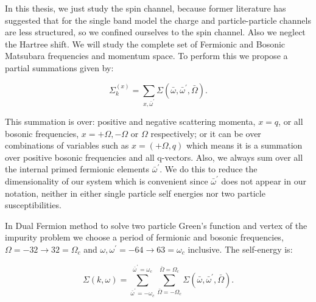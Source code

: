 In this thesis, we just study the spin channel, because former literature has suggested that for the single band model the charge and particle-particle channels are less structured, so we confined ourselves to the spin channel. Also we neglect the Hartree shift. We will study the complete set of Fermionic and Bosonic Matsubara frequencies and momentum space. To perform this we propose a partial summations given by:

\begin{equation}
    \Sigma_k^{(x)}= \sum\limits_{x, \bar{\omega}^\prime} \Sigma(\bar{\omega},\bar{\omega}^\prime, \bar{\Omega}).
\end{equation}

This summation is over: positive and negative scattering momenta, $x=q$, or all bosonic frequencies, $x= +\Omega, -\Omega$  or $\Omega$ respectively; or it can be over combinations of variables such as $x=(+\Omega, q)$ which means it is a summation over positive bosonic frequencies and all q-vectors. Also, we always sum over all the internal primed fermionic elements $\bar{\omega}^\prime$. We do this to reduce the dimensionality of our system which is convenient since $\bar{\omega}^\prime$ does not appear in our notation, neither in either single particle self energies nor two particle susceptibilities.

In Dual Fermion method to solve two particle Green's function and vertex of the impurity problem we choose a period of fermionic and bosonic frequencies, $\Omega= -32 \to 32= \Omega_c$ and $\omega,\omega^\prime = -64 \to 63=\omega_c$ inclusive. The self-energy is:

    \begin{equation}
     \Sigma(k,\omega)= \sum\limits_{ \bar{\omega}^\prime =-\omega _c}^{ \bar{\omega}^\prime =\omega _c}\sum\limits_{ \bar{\Omega} =-\Omega _c}^{\bar{\Omega} =\Omega _c} \Sigma(\bar{\omega},\bar{\omega}^\prime, \bar{\Omega}).
\end{equation}


